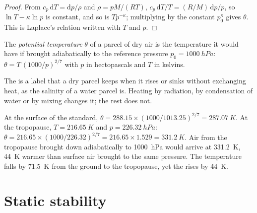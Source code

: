 \begin{proof}
From $c_p\,\mathrm dT = \mathrm dp/\rho$ and $\rho = pM/(RT)$, $c_p\,\mathrm dT/T
= (R/M)\,\mathrm dp/p$, so $\ln T - \kappa \ln p$ is constant, and so is $T
p^{-\kappa}$; multiplying by the constant $p_0^{\kappa}$ gives $\theta$. This is
Laplace's relation written with $T$ and $p$.
\end{proof}

\begin{definition}\label{def:b1:fluid-envelopes-structure:potential-temperature}
The \emph{potential temperature} $\theta$ of a
parcel of dry air is the temperature it would have if brought adiabatically to
the reference pressure $p_0 = \qty{1000}{hPa}$: $\theta = T\,(1000/p)^{2/7}$ with
$p$ in hectopascals and $T$ in kelvins.
\end{definition}

The  is a label that a dry parcel keeps when it rises or
sinks without exchanging heat, as the salinity of a water parcel is. Heating by
radiation, by condensation of water or by mixing changes it; the rest does not.

\begin{example}\label{ex:b1:fluid-envelopes-structure:tropopause}
At the surface of the standard, $\theta = 288.15 \times (1000/1013.25)^{2/7} =
\qty{287.07}{K}$. At the tropopause, $T = \qty{216.65}{K}$ and $p =
\qty{226.32}{hPa}$: $\theta = 216.65 \times (1000/226.32)^{2/7} = 216.65 \times
1.529 = \qty{331.2}{K}$. Air from the tropopause brought down adiabatically to
\qty{1000}{hPa} would arrive at \qty{331.2}{K}, \qty{44}{K} warmer than surface
air brought to the same pressure. The temperature falls by \qty{71.5}{K} from
the ground to the tropopause, yet the  rises by
\qty{44}{K}.
\end{example}

\section{Static stability}\label{sec:b1:fluid-envelopes-structure:stability}

